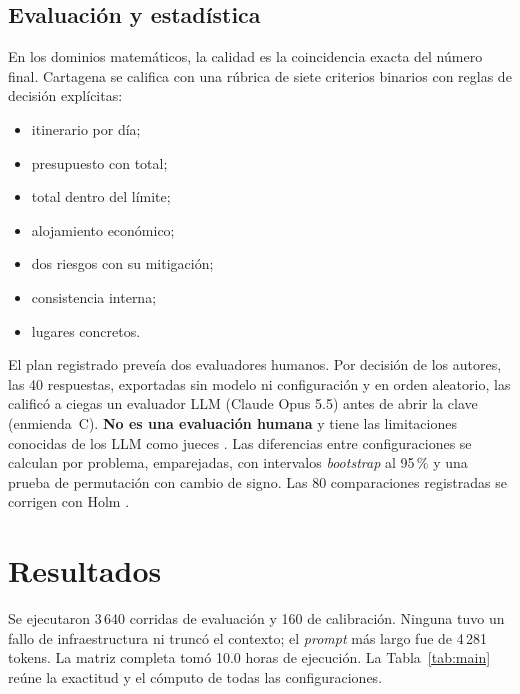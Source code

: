 \documentclass[conference]{IEEEtran}
\begin{document}
\subsection{Evaluación y estadística}

En los dominios matemáticos, la calidad es la coincidencia exacta del número final. Cartagena se califica con una rúbrica de siete criterios binarios con reglas de decisión explícitas:
\begin{itemize}
\item itinerario por día;
\item presupuesto con total;
\item total dentro del límite;
\item alojamiento económico;
\item dos riesgos con su mitigación;
\item consistencia interna;
\item lugares concretos.
\end{itemize}
El plan registrado preveía dos evaluadores humanos. Por decisión de los autores, las 40 respuestas, exportadas sin modelo ni configuración y en orden aleatorio, las calificó a ciegas un evaluador LLM (Claude Opus 5.5) antes de abrir la clave (enmienda~C). \textbf{No es una evaluación humana} y tiene las limitaciones conocidas de los LLM como jueces \cite{zheng2023judging}. Las diferencias entre configuraciones se calculan por problema, emparejadas, con intervalos \textit{bootstrap} al 95\,\% y una prueba de permutación con cambio de signo. Las 80 comparaciones registradas se corrigen con Holm \cite{holm1979}.

\section{Resultados}

Se ejecutaron 3\,640 corridas de evaluación y 160 de calibración. Ninguna tuvo un fallo de infraestructura ni truncó el contexto; el \textit{prompt} más largo fue de 4\,281 tokens. La matriz completa tomó 10.0 horas de ejecución. La Tabla~\ref{tab:main} reúne la exactitud y el cómputo de todas las configuraciones.
\end{document}
